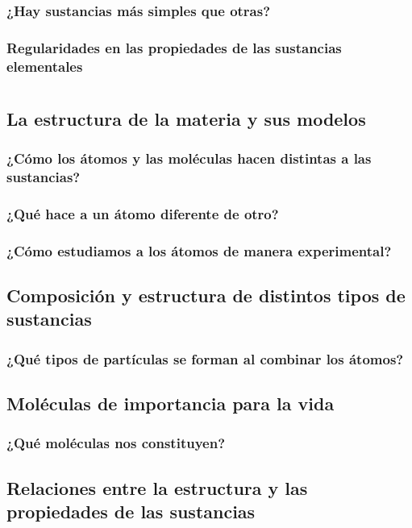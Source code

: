 \documentclass[11pt]{book}
\begin{document}
\subsection{¿Hay sustancias más simples que otras?}
\subsection{Regularidades en las propiedades de las sustancias elementales}

\chapter{}

\section{La estructura de la materia y sus modelos}
\subsection{¿Cómo los átomos y las moléculas hacen distintas a las sustancias?}
\subsection{¿Qué hace a un átomo diferente de otro?}
\subsection{¿Cómo estudiamos a los átomos de manera experimental?}

\section{Composición y estructura de distintos tipos de sustancias}
\subsection{¿Qué tipos de partículas se forman al combinar los átomos?}

\section{Moléculas de importancia para la vida}
\subsection{¿Qué moléculas nos constituyen?}

\section{Relaciones entre la estructura y las propiedades de las sustancias}
\end{document}
